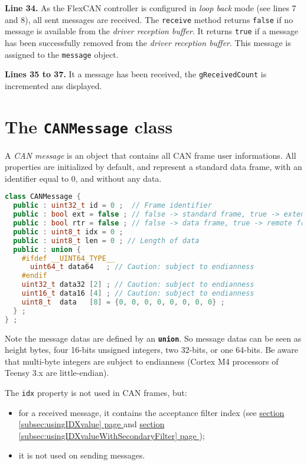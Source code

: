 \documentclass[9pt, a4paper, obeyspaces, openany]{extarticle}
\newcommand \sectionLabel[2]{\section{#1}\label{sec:#2}}
\newcommand\refSubsectionPage[1]{\hyperref[subsec:#1]{section \ref*{subsec:#1} page \pageref{subsec:#1}}}
\begin{document}
{\bf Line 34.} As the FlexCAN controller is configured in \emph{loop back} mode (see lines 7 and 8), all sent messages are received. The \texttt{receive} method returns \texttt{false} if no message is available from the \emph{driver reception buffer}. It returns \texttt{true} if a message has been successfully removed from the \emph{driver reception buffer}. This message is assigned to the \texttt{message} object.

{\bf Lines 35 to 37.} It a message has been received, the \texttt{gReceivedCount} is incremented ans displayed.





\sectionLabel{The \texttt{CANMessage} class}{CANMessageClass}

A \emph{CAN message} is an object that contains all CAN frame user informations. All properties are initialized by default, and represent a standard data frame, with an identifier equal to $0$, and without any data.

{ \small\begin{lstlisting}[language=c++]
class CANMessage {
  public : uint32_t id = 0 ;  // Frame identifier
  public : bool ext = false ; // false -> standard frame, true -> extended
  public : bool rtr = false ; // false -> data frame, true -> remote frame
  public : uint8_t idx = 0 ;
  public : uint8_t len = 0 ; // Length of data
  public : union {
    #ifdef __UINT64_TYPE__
      uint64_t data64   ; // Caution: subject to endianness
    #endif
    uint32_t data32 [2] ; // Caution: subject to endianness
    uint16_t data16 [4] ; // Caution: subject to endianness
    uint8_t  data   [8] = {0, 0, 0, 0, 0, 0, 0, 0} ;
  } ;
} ;
\end{lstlisting}}

Note the message datas are defined by an {\bf\texttt{union}}. So message datas can be seen as height bytes, four 16-bits unsigned integers, two 32-bits, or one 64-bits. Be aware that multi-byte integers are subject to endianness (Cortex M4 processors of Teensy 3.x are little-endian).

The \texttt{idx} property is not used in CAN frames, but:
\begin{itemize}
  \item for a received message, it contains the acceptance filter index (see \refSubsectionPage{usingIDXvalue} and \refSubsectionPage{usingIDXvalueWithSecondaryFilter});
  \item it is not used on sending messages.
\end{itemize}
\end{document}
